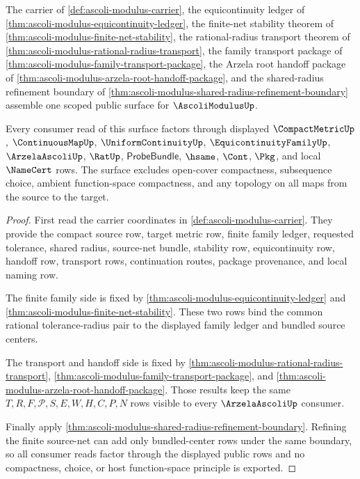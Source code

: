 \begin{theorem}
\label{thm:ascoli-modulus-scoped-public-surface}
The carrier of \autoref{def:ascoli-modulus-carrier}, the equicontinuity ledger of \autoref{thm:ascoli-modulus-equicontinuity-ledger}, the finite-net stability theorem of \autoref{thm:ascoli-modulus-finite-net-stability}, the rational-radius transport theorem of \autoref{thm:ascoli-modulus-rational-radius-transport}, the family transport package of \autoref{thm:ascoli-modulus-family-transport-package}, the Arzela root handoff package of \autoref{thm:ascoli-modulus-arzela-root-handoff-package}, and the shared-radius refinement boundary of \autoref{thm:ascoli-modulus-shared-radius-refinement-boundary} assemble one scoped public surface for $\AscoliModulusUp$.

Every consumer read of this surface factors through displayed $\CompactMetricUp$, $\ContinuousMapUp$, $\UniformContinuityUp$, $\EquicontinuityFamilyUp$, $\ArzelaAscoliUp$, $\RatUp$, $\mathsf{ProbeBundle}$, $\hsame$, $\Cont$, $\Pkg$, and local $\NameCert$ rows. The surface excludes open-cover compactness, subsequence choice, ambient function-space compactness, and any topology on all maps from the source to the target.
\end{theorem}
\begin{proof}
First read the carrier coordinates in \autoref{def:ascoli-modulus-carrier}. They provide the compact source row, target metric row, finite family ledger, requested tolerance, shared radius, source-net bundle, stability row, equicontinuity row, handoff row, transport rows, continuation routes, package provenance, and local naming row.

The finite family side is fixed by \autoref{thm:ascoli-modulus-equicontinuity-ledger} and \autoref{thm:ascoli-modulus-finite-net-stability}. These two rows bind the common rational tolerance-radius pair to the displayed family ledger and bundled source centers.

The transport and handoff side is fixed by \autoref{thm:ascoli-modulus-rational-radius-transport}, \autoref{thm:ascoli-modulus-family-transport-package}, and \autoref{thm:ascoli-modulus-arzela-root-handoff-package}. Those results keep the same $T,R,F,\mathcal{P},S,E,W,H,C,P,N$ rows visible to every $\ArzelaAscoliUp$ consumer.

Finally apply \autoref{thm:ascoli-modulus-shared-radius-refinement-boundary}. Refining the finite source-net can add only bundled-center rows under the same boundary, so all consumer reads factor through the displayed public rows and no compactness, choice, or host function-space principle is exported.
\end{proof}

